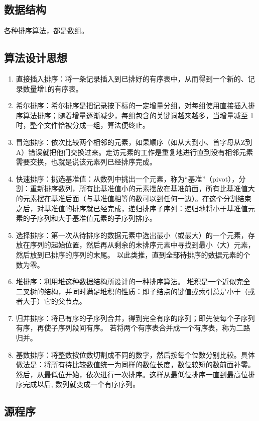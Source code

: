 \documentclass[a4paper,11pt,UTF8]{ctexart}
\begin{document}
\subsection{数据结构}
各种排序算法，都是数组。
\subsection{算法设计思想}

\begin{enumerate}
	\item 直接插入排序：将一条记录插入到已排好的有序表中，从而得到一个新的、记录数量增1的有序表。
	\item 希尔排序：希尔排序是把记录按下标的一定增量分组，对每组使用直接插入排序算法排序；随着增量逐渐减少，每组包含的关键词越来越多，当增量减至 1 时，整个文件恰被分成一组，算法便终止。
	\item 冒泡排序：依次比较两个相邻的元素，如果顺序（如从大到小、首字母从Z到A）错误就把他们交换过来。走访元素的工作是重复地进行直到没有相邻元素需要交换，也就是说该元素列已经排序完成。
	\item 快速排序：挑选基准值：从数列中挑出一个元素，称为“基准”（pivot），分割：重新排序数列，所有比基准值小的元素摆放在基准前面，所有比基准值大的元素摆在基准后面（与基准值相等的数可以到任何一边）。在这个分割结束之后，对基准值的排序就已经完成，递归排序子序列：递归地将小于基准值元素的子序列和大于基准值元素的子序列排序。
	\item 选择排序：第一次从待排序的数据元素中选出最小（或最大）的一个元素，存放在序列的起始位置，然后再从剩余的未排序元素中寻找到最小（大）元素，然后放到已排序的序列的末尾。 以此类推，直到全部待排序的数据元素的个数为零。
	\item 堆排序：利用堆这种数据结构所设计的一种排序算法。 堆积是一个近似完全二叉树的结构，并同时满足堆积的性质：即子结点的键值或索引总是小于（或者大于）它的父节点。
	\item 归并排序：将已有序的子序列合并，得到完全有序的序列；即先使每个子序列有序，再使子序列段间有序。 若将两个有序表合并成一个有序表，称为二路归并。
	\item 基数排序：将整数按位数切割成不同的数字，然后按每个位数分别比较。具体做法是：将所有待比较数值统一为同样的数位长度，数位较短的数前面补零。然后，从最低位开始，依次进行一次排序。这样从最低位排序一直到最高位排序完成以后, 数列就变成一个有序序列。
\end{enumerate}\par

\subsection{源程序}
\end{document}
